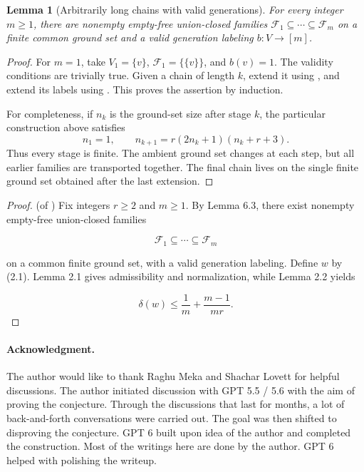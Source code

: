 \documentclass[11pt]{article}
\newtheorem{lemma}[lemma]{Lemma}
\newcommand{\<}{\langle}
\renewcommand{\>}{\rangle}
\newcommand{\F}{\mathcal{F}}
\numberwithin{equation}{section}
\begin{document}
\begin{lemma}[Arbitrarily long chains with valid generations]\label{lem:iterated-chain}
For every integer $m\ge1$, there are nonempty empty-free union-closed
families $\F_1\subseteq\cdots\subseteq\F_m$ on a finite common ground set
and a valid generation labeling $b:V\to[m]$.
\end{lemma}
\begin{proof}
For $m=1$, take $V_1=\{v\}$, $\F_1=\{\{v\}\}$, and $b(v)=1$. The validity
conditions are trivially true. Given a chain of length $k$, extend it using
, and extend its labels using
. This proves the assertion by induction.

For completeness, if $n_k$ is the ground-set size after stage $k$, the
particular construction above satisfies
\[
 n_1=1,\qquad n_{k+1}=r(2n_k+1)(n_k+r+3).
\]
Thus every stage is finite. The ambient ground set changes at each step,
but all earlier families are transported together. The final chain lives
on the single finite ground set obtained after the last extension.
\end{proof}

\begin{proof}(of )
    Fix integers \(r\ge2\) and \(m\ge1\). By Lemma 6.3, there exist nonempty empty-free union-closed families

$$ \mathcal F_1\subseteq\cdots\subseteq\mathcal F_m $$

on a common finite ground set, with a valid generation labeling. Define \(w\) by (2.1). Lemma 2.1 gives admissibility and normalization, while Lemma 2.2 yields

$$ \delta(w)\le\frac1m+\frac{m-1}{mr}. $$
\end{proof}

\paragraph{Acknowledgment. }The author would like to thank Raghu Meka and Shachar Lovett for helpful discussions. The author initiated discussion with GPT 5.5 / 5.6 with the aim of proving the conjecture. Through the discussions that last for months, a lot of back-and-forth conversations were carried out. The goal was then shifted to disproving the conjecture. GPT 6 built upon idea of the author and completed the construction. Most of the writings here are done by the author. GPT 6 helped with polishing the writeup.




\end{document}
